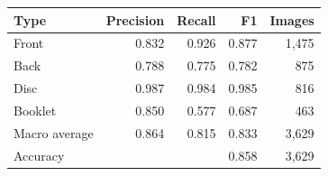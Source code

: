 \begin{tabular}{@{}lrrrr@{}}
\toprule
Type & Precision & Recall & F1 & Images \\
\midrule
Front & 0.832 & 0.926 & 0.877 & 1,475 \\
Back & 0.788 & 0.775 & 0.782 & 875 \\
Disc & 0.987 & 0.984 & 0.985 & 816 \\
Booklet & 0.850 & 0.577 & 0.687 & 463 \\
\midrule
Macro average & 0.864 & 0.815 & 0.833 & 3,629 \\
Accuracy & & & 0.858 & 3,629 \\
\bottomrule
\end{tabular}
